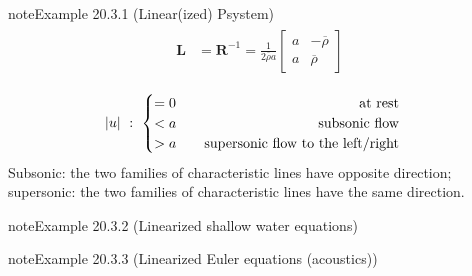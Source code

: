 \documentclass[letterpaper,10pt,english]{jupyterBook}
\begin{document}
\begin{sphinxadmonition}{note}{Example 20.3.1 (Linear(ized) P\sphinxhyphen{}system)}
\begin{equation*}
\begin{split}
\begin{aligned}
  \mathbf{L} & = \mathbf{R}^{-1} = \frac{1}{2 \overline{\rho} a} \begin{bmatrix} a & -\overline{\rho} \\ a & \overline{\rho} \end{bmatrix} \\
\end{aligned}\end{split}
\end{equation*}
\sphinxAtStartPar
{}
\begin{equation*}
\begin{split}|u| \ : \  
\begin{cases}
   = 0 \hfill \qquad \text{at rest} \\
   < a \hfill \qquad \text{subsonic flow} \\
   > a \hfill \qquad \text{supersonic flow to the left/right} \\
\end{cases}
\end{split}
\end{equation*}
\sphinxAtStartPar
Subsonic: the two families of characteristic lines have opposite direction; supersonic: the two families of characteristic lines have the same direction.
\end{sphinxadmonition}
\label{ch/pde/hyperbolic:example-1}
\begin{sphinxadmonition}{note}{Example 20.3.2 (Linearized shallow water equations)}


\end{sphinxadmonition}
\label{ch/pde/hyperbolic:example-2}
\begin{sphinxadmonition}{note}{Example 20.3.3 (Linearized Euler equations (acoustics))}


\end{sphinxadmonition}
\label{ch/pde/hyperbolic:example-3}
\end{document}
